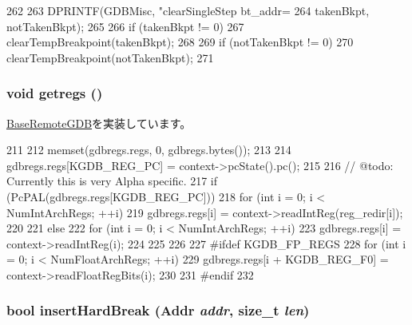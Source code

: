 \begin{DoxyCode}
262 {
263     DPRINTF(GDBMisc, "clearSingleStep bt_addr=%
264             takenBkpt, notTakenBkpt);
265 
266     if (takenBkpt != 0)
267         clearTempBreakpoint(takenBkpt);
268 
269     if (notTakenBkpt != 0)
270         clearTempBreakpoint(notTakenBkpt);
271 }
\end{DoxyCode}
\hypertarget{classAlphaISA_1_1RemoteGDB_a62bc8adc5a48f1cbb5eb9bb64301d38d}{
\subsubsection[{getregs}]{\setlength{\rightskip}{0pt plus 5cm}void getregs ()}}
\label{classAlphaISA_1_1RemoteGDB_a62bc8adc5a48f1cbb5eb9bb64301d38d}


\hyperlink{classBaseRemoteGDB_aca04756a764f2ef2add9ee91be012659}{BaseRemoteGDB}を実装しています。


\begin{DoxyCode}
211 {
212     memset(gdbregs.regs, 0, gdbregs.bytes());
213 
214     gdbregs.regs[KGDB_REG_PC] = context->pcState().pc();
215 
216     // @todo: Currently this is very Alpha specific.
217     if (PcPAL(gdbregs.regs[KGDB_REG_PC])) {
218         for (int i = 0; i < NumIntArchRegs; ++i) {
219             gdbregs.regs[i] = context->readIntReg(reg_redir[i]);
220         }
221     } else {
222         for (int i = 0; i < NumIntArchRegs; ++i) {
223             gdbregs.regs[i] = context->readIntReg(i);
224         }
225     }
226 
227 #ifdef KGDB_FP_REGS
228     for (int i = 0; i < NumFloatArchRegs; ++i) {
229         gdbregs.regs[i + KGDB_REG_F0] = context->readFloatRegBits(i);
230     }
231 #endif
232 }
\end{DoxyCode}
\hypertarget{classAlphaISA_1_1RemoteGDB_a6a65f23f1e316fc2362cced431fa2335}{
\subsubsection[{insertHardBreak}]{\setlength{\rightskip}{0pt plus 5cm}bool insertHardBreak ({\bf Addr} {\em addr}, \/  size\_\-t {\em len})}}
\label{classAlphaISA_1_1RemoteGDB_a6a65f23f1e316fc2362cced431fa2335}



